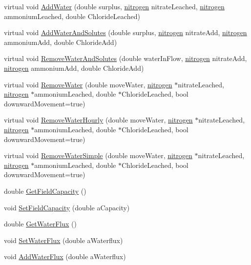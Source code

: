 \begin{DoxyCompactItemize}
\item 
virtual void \hyperlink{classsoil_layer_a491ca2b3b788a1c66221610124e19929}{AddWater} (double surplus, \hyperlink{classnitrogen}{nitrogen} nitrateLeached, \hyperlink{classnitrogen}{nitrogen} ammoniumLeached, double ChlorideLeached)
\item 
virtual void \hyperlink{classsoil_layer_af8268406c1828af1fdd3fe704d386f1e}{AddWaterAndSolutes} (double surplus, \hyperlink{classnitrogen}{nitrogen} nitrateAdd, \hyperlink{classnitrogen}{nitrogen} ammoniumAdd, double ChlorideAdd)
\item 
virtual void \hyperlink{classsoil_layer_aa3c2588bb518594ccb63a7004bc823d4}{RemoveWaterAndSolutes} (double waterInFlow, \hyperlink{classnitrogen}{nitrogen} nitrateAdd, \hyperlink{classnitrogen}{nitrogen} ammoniumAdd, double ChlorideAdd)
\item 
virtual void \hyperlink{classsoil_layer_a4043ef6ea471e4645efd82054aa78877}{RemoveWater} (double moveWater, \hyperlink{classnitrogen}{nitrogen} $\ast$nitrateLeached, \hyperlink{classnitrogen}{nitrogen} $\ast$ammoniumLeached, double $\ast$ChlorideLeached, bool downwardMovement=true)
\item 
virtual void \hyperlink{classsoil_layer_a88b4d99d40dcc208f9a4c3776e85d130}{RemoveWaterHourly} (double moveWater, \hyperlink{classnitrogen}{nitrogen} $\ast$nitrateLeached, \hyperlink{classnitrogen}{nitrogen} $\ast$ammoniumLeached, double $\ast$ChlorideLeached, bool downwardMovement=true)
\item 
virtual void \hyperlink{classsoil_layer_a9ec6879510dcc7029c8f8450281688de}{RemoveWaterSimple} (double moveWater, \hyperlink{classnitrogen}{nitrogen} $\ast$nitrateLeached, \hyperlink{classnitrogen}{nitrogen} $\ast$ammoniumLeached, double $\ast$ChlorideLeached, bool downwardMovement=true)
\item 
double \hyperlink{classsoil_layer_aab16e356a7dad4934471e1b0f74589ec}{GetFieldCapacity} ()
\item 
void \hyperlink{classsoil_layer_a3483f1af86de1d9478d2d68d671ef622}{SetFieldCapacity} (double aCapacity)
\item 
double \hyperlink{classsoil_layer_a41a31736ecff9877a3fbc566eb11e1ad}{GetWaterFlux} ()
\item 
void \hyperlink{classsoil_layer_a8b23d590179f5af403f95521d83aa98c}{SetWaterFlux} (double aWaterflux)
\item 
void \hyperlink{classsoil_layer_abe420fbd64b9f2687061a1b7359c2621}{AddWaterFlux} (double aWaterflux)
\item 

\end{DoxyCompactItemize}
